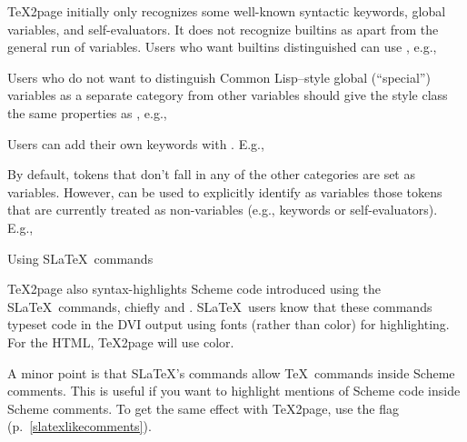 {{{{{{{{{{{{{{


\n \TeX2page initially only recognizes some well-known
syntactic keywords, global variables, and
self-evaluators.  It does not recognize builtins as
apart from the general run of variables.  Users who
want builtins distinguished can use
\p{\scmbuiltin}, e.g.,


Users who do not want to distinguish Common Lisp–style
global (“special”) variables as a separate category from
other variables should give the style class  the
same properties as , e.g.,


Users can add their own keywords with \p{\scmkeyword}.
E.g.,


By default, tokens that don’t fall in any of the
other categories are set as variables.  However,
\p{\scmvariable} can be used to explicitly identify as
variables those tokens that are currently treated as
non-variables (e.g., keywords or self-evaluators).  E.g.,


\beginsection Using S\LaTeX\ commands

%
\TeX2page also syntax-highlights Scheme code introduced
using the S\LaTeX\ commands, chiefly
\p{\scheme} and .  S\LaTeX\ users know
that these commands typeset code in the DVI output
using fonts (rather than color) for highlighting.
For the HTML, \TeX2page will use color.

A minor point is that S\LaTeX’s commands allow \TeX\
commands inside Scheme comments.  This is useful
if you want to highlight mentions of Scheme code inside
Scheme comments.  To get the same effect with \TeX2page,
use the \p{\TZPslatexcomments} flag (p.~\ref{slatexlikecomments}).

}}}}}}}}}}}}}}
